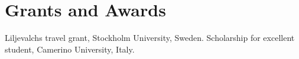 \section{Grants and Awards}

\begin{cventries}
     Liljevalchs travel grant, Stockholm University, Sweden.
     Scholarship for excellent student, Camerino University, Italy.

\end{cventries}
